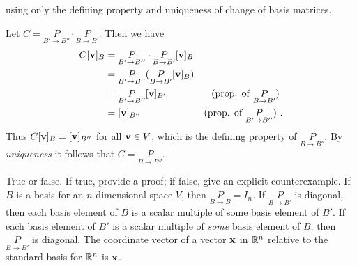 using only the defining property and uniqueness of change of basis matrices. 
\\
\begin{solution}
\noindent Let $C=\underset{B'\rightarrow B''}{P}\cdot \underset{B\rightarrow B'}{P} 
$. Then we have 
\begin{align*}
C[{\mathbf v}]_B&=\underset{B'\rightarrow B''}{P}\cdot \underset{B\rightarrow B'}{P} 
[{\mathbf v}]_B\\
&=\underset{B'\rightarrow B''}{P}(\underset{B\rightarrow B'}{P} 
[{\mathbf v}]_B)\\
&=\underset{B'\rightarrow B''}{P}[{\mathbf v}]_{B'} &\text{(prop. of $\underset{B\rightarrow B'}{P}$) }\\
&=[{\mathbf v}]_{B''} &\text{(prop. of $\underset{B'\rightarrow B''}{P}$) }.
\end{align*}
Thus $C[{\mathbf v}]_B=[{\mathbf v}]_{B''}$ for all ${\mathbf v}\in V$, which is the defining property of $\underset{B\rightarrow B''}{P}$. By {\em uniqueness} it follows that $C=\underset{B\rightarrow B''}{P}$.
\end{solution}
\ii True or false. If true, provide a proof; if false, give an explicit counterexample. 
\bb
\ii If $B$ is a basis for an $n$-dimensional space $V$, then $\underset{B\rightarrow B}{P}=I_n$. 
\ii If $\underset{B\rightarrow B'}{P}$ is diagonal, then each basis element of $B$ is a scalar multiple of some basis element of $B'$. 
\ii If each basis element of $B'$ is a scalar multiple of {\em some} basis element of $B$, then $\underset{B\rightarrow B'}{P}$ is diagonal. 
\ii The coordinate vector of a vector ${\mathbf x}$ in ${\mathbb R}^n$ relative to the standard basis for ${\mathbb R}^n$ is ${\mathbf x}$.
\ee
